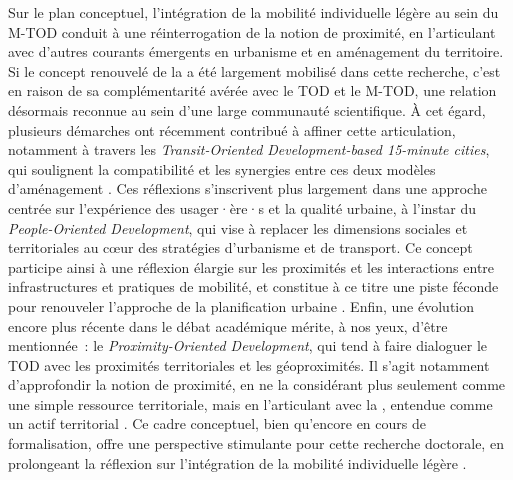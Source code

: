 \begin{refsegment}
Sur le plan conceptuel, l’intégration de la mobilité individuelle légère au sein du \acrshort{M-TOD} conduit à une réinterrogation de la notion de proximité, en l’articulant avec d’autres courants émergents en urbanisme et en aménagement du territoire. Si le concept renouvelé de la  a été largement mobilisé dans cette recherche, c’est en raison de sa complémentarité avérée avec le \acrshort{TOD} et le \acrshort{M-TOD}, une relation désormais reconnue au sein d’une large communauté scientifique. À cet égard, plusieurs démarches ont récemment contribué à affiner cette articulation, notamment à travers les \textsl{Transit-Oriented Development-based 15-minute cities}, qui soulignent la compatibilité et les synergies entre ces deux modèles d’aménagement \textcolor{blue}{\autocite[11]{wolanski_potential_2023}}. Ces réflexions s’inscrivent plus largement dans une approche centrée sur l’expérience des usager·ère·s et la qualité urbaine, à l’instar du \textsl{People-Oriented Development}, qui vise à replacer les dimensions sociales et territoriales au cœur des stratégies d’urbanisme et de transport. Ce concept participe ainsi à une réflexion élargie sur les proximités et les interactions entre infrastructures et pratiques de mobilité, et constitue à ce titre une piste féconde pour renouveler l’approche de la planification urbaine \textcolor{blue}{\autocite{davis_people_2024}}. Enfin, une évolution encore plus récente dans le débat académique mérite, à nos yeux, d’être mentionnée~: le \textsl{Proximity-Oriented Development}, qui tend à faire dialoguer le \acrshort{TOD} avec les proximités territoriales et les géoproximités. Il s'agit notamment d'approfondir la notion de proximité, en ne la considérant plus seulement comme une simple ressource territoriale, mais en l'articulant avec la , entendue comme un actif territorial \textcolor{blue}{\autocite{lebrun_proximite_2024}}. Ce cadre conceptuel, bien qu’encore en cours de formalisation, offre une perspective stimulante pour cette recherche doctorale, en prolongeant la réflexion sur l’intégration de la mobilité individuelle légère \textcolor{blue}{\autocite[3]{plastara_15-minute_2023}}.%


\end{refsegment}
